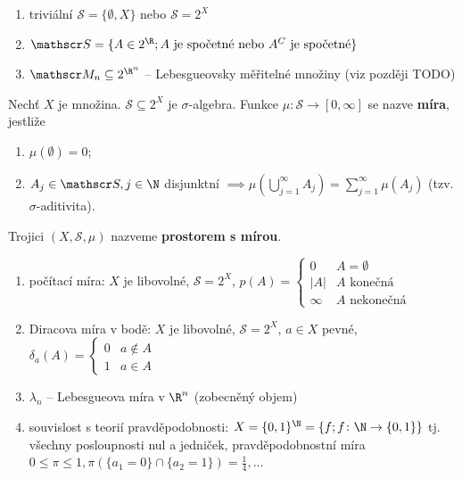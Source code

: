 \begin{priklad}
  \begin{enumerate}[1.]
    \item triviální $\mathscr S = \{\emptyset, X\}$ nebo $\mathscr S = 2^X$
    \item $\mathscr S = \{A \in 2^{\R}; A \text{ je spočetné nebo }A^C\text{ je spočetné}\}$
    \item $\mathscr M_n \subseteq 2^{\R^n}$ -- Lebesgueovsky měřitelné množiny (viz později TODO)
  \end{enumerate}
\end{priklad}

\begin{definice}
  Nechť $X$ je množina. $\mathscr S \subseteq 2^X$ je $\sigma$-algebra. Funkce $\mu\colon \mathscr S \to [0, \infty]$ se nazve \textbf{míra}, jestliže
  \begin{enumerate}[1.]
    \item $\mu(\emptyset) = 0$;
    \item $A_j \in \mathscr S, j \in \N$ disjunktní $\implies \mu\left(\bigcup_{j=1}^\infty A_j \right) = \sum_{j=1}^\infty \mu(A_j)$ (tzv. $\sigma$-aditivita).
  \end{enumerate}
  Trojici $(X, \mathscr S, \mu)$ nazveme \textbf{prostorem s mírou}.
\end{definice}

\begin{priklad}
  \begin{enumerate}[1.]
    \item počítací míra: $X$ je libovolné, $\mathscr S=2^X$, $p(A)=\begin{cases}
        0 & A = \emptyset\\
        |A| & A \text{ konečná}\\
        \infty & A \text{ nekonečná}
      \end{cases}$
    \item Diracova míra v bodě: $X$ je libovolné, $\mathscr S = 2^X$, $a \in X$ pevné, $\delta_a(A)=\begin{cases}
        0 & a \notin A\\
        1 & a \in A
      \end{cases}$
    \item $\lambda_n$ -- Lebesgueova míra v $\R^n$ (zobecněný objem)
    \item souvislost s teorií pravděpodobnosti: $X=\{0,1\}^{\N}=\left\{f; f\colon \N \to \{0, 1\}\right\}$ tj. všechny posloupnosti nul a jedniček, pravděpodobnostní míra $0\leq \pi \leq 1, \pi\left(\{a_1 = 0\}\cap \{a_2 = 1\}\right)=\frac{1}{4}, \dots$
  \end{enumerate}
\end{priklad}

